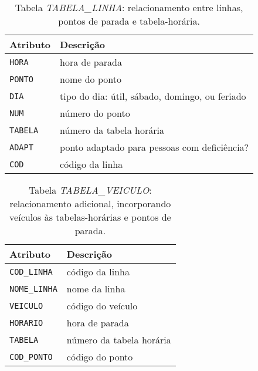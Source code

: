 \begin{table}[h]
\caption{Tabela \emph{TABELA\_LINHA}: relacionamento entre linhas, pontos de parada e tabela-horária.}
    \centering
    \begin{tabular}{ p{5cm}p{9cm}} 
        \hline
        Atributo & Descrição\\
        \hline
        \texttt{HORA}   & hora de parada \\
        \texttt{PONTO}  & nome do ponto  \\
        \texttt{DIA}    & tipo do dia: útil, sábado, domingo, ou feriado \\
        \texttt{NUM}    & número do ponto \\
        \texttt{TABELA} & número da tabela horária  \\
        \texttt{ADAPT}  & ponto adaptado para pessoas com deficiência? \\
        \texttt{COD} & código da linha \\
        \hline 
    \end{tabular}
    \label{tab:tabela_linha}
\end{table}

\begin{table}[htb]
    \caption{Tabela \emph{TABELA\_VEICULO}: relacionamento adicional, incorporando veículos às tabelas-horárias e pontos de parada.}
    \centering
    \begin{tabular}{ p{5cm}p{9cm}} 
        \hline
        Atributo & Descrição\\
        \hline
        \texttt{COD\_LINHA}  & código da linha \\
        \texttt{NOME\_LINHA} & nome da linha \\
        \texttt{VEICULO}     & código do veículo \\
        \texttt{HORARIO}     & hora de parada \\
        \texttt{TABELA}      & número da tabela horária  \\
        \texttt{COD\_PONTO}  & código do ponto \\
        \hline 
    \end{tabular}
    \label{tab:tabela_veiculo}
\end{table}

